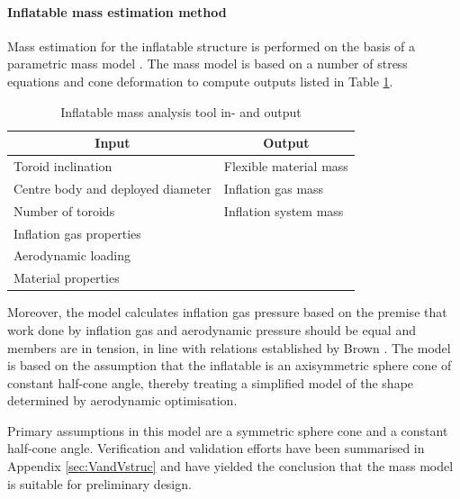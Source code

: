 \paragraph{Inflatable mass estimation method}

Mass estimation for the inflatable structure is performed on the basis of a parametric mass model \cite{Samareh2011}. The mass model is based on a number of stress equations and cone deformation to compute outputs listed in Table \ref{tab:inflmass}.
\begin{table}[ht]
\caption{Inflatable mass analysis tool in- and output}
\centering
\begin{tabular}{|l||l|}
\hline
\multicolumn{1}{|c||}{{\bf Input}} & \multicolumn{1}{c|}{{\bf Output}} \\ \hline \hline
Toroid inclination         & Flexible material mass            \\ \hline
Centre body and deployed diameter        & Inflation gas mass                 \\ \hline
Number of toroids                 & Inflation system mass                \\ \hline
Inflation gas properties              &              \\ \hline
Aerodynamic loading               &                                   \\ \hline
Material properties  &                                   \\ \hline
\end{tabular}
\label{tab:inflmass}
\end{table}
Moreover, the model calculates inflation gas pressure based on the premise that work done by inflation gas and aerodynamic pressure should be equal and members are in tension, in line with relations established by Brown \cite{Brown2009}. The model is based on the assumption that the inflatable is an axisymmetric sphere cone of constant half-cone angle, thereby treating a simplified model of the shape determined by aerodynamic optimisation.

Primary assumptions in this model are a symmetric sphere cone and a constant half-cone angle. Verification and validation efforts have been summarised in Appendix \ref{sec:VandVstruc} and have yielded the conclusion that the mass model is suitable for preliminary design.










